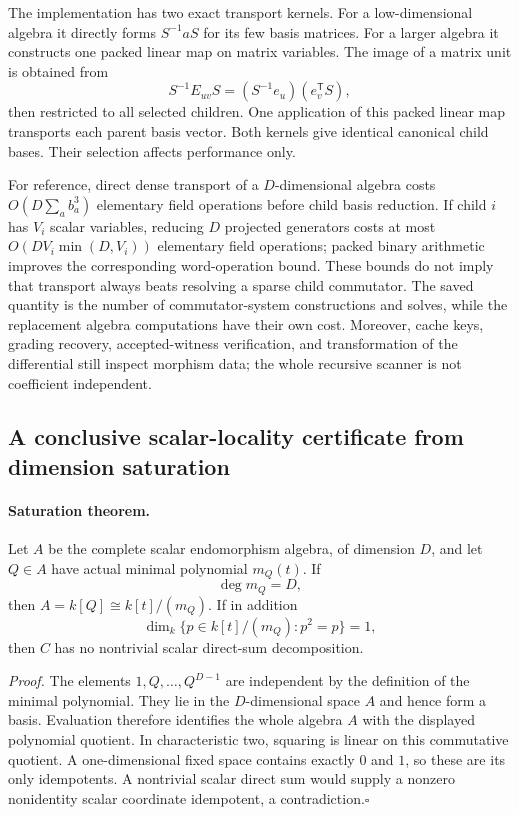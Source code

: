 The implementation has two exact transport kernels. For a low-dimensional
algebra it directly forms $S^{-1}aS$ for its few basis matrices. For a larger
algebra it constructs one packed linear map on matrix variables. The image
of a matrix unit is obtained from
\[
 S^{-1}E_{uv}S=(S^{-1}e_u)(e_v^{\mathsf T}S),
\]
then restricted to all selected children. One application of this packed
linear map transports each parent basis vector. Both kernels give identical
canonical child bases. Their selection affects performance only.

For reference, direct dense transport of a $D$-dimensional algebra costs
$O(D\sum_a b_a^3)$ elementary field operations before child basis
reduction. If child $i$ has $V_i$ scalar variables, reducing $D$ projected
generators costs at most $O(DV_i\min(D,V_i))$ elementary field operations;
packed binary arithmetic improves the corresponding word-operation bound.
These bounds do not imply that transport always beats resolving a sparse
child commutator. The saved quantity is the number of commutator-system
constructions and solves, while the replacement algebra computations have
their own cost. Moreover, cache keys, grading recovery, accepted-witness
verification, and transformation of the differential still inspect
morphism data; the whole recursive scanner is not coefficient independent.

\subsection{A conclusive scalar-locality certificate from dimension saturation}

\paragraph{Saturation theorem.}
Let $A$ be the complete scalar endomorphism algebra, of dimension $D$, and
let $Q\in A$ have actual minimal polynomial $m_Q(t)$. If
\[
 \deg m_Q=D,
\]
then $A=k[Q]\cong k[t]/(m_Q)$. If in addition
\[
 \dim_k\{p\in k[t]/(m_Q):p^2=p\}=1,
\]
then $C$ has no nontrivial scalar direct-sum decomposition.

\emph{Proof.}
The elements $1,Q,\ldots,Q^{D-1}$ are independent by the definition of the
minimal polynomial. They lie in the $D$-dimensional space $A$ and hence form
a basis. Evaluation therefore identifies the whole algebra $A$ with the
displayed polynomial quotient. In characteristic two, squaring is linear
on this commutative quotient. A one-dimensional fixed space contains exactly
$0$ and $1$, so these are its only idempotents. A nontrivial scalar direct
sum would supply a nonzero nonidentity scalar coordinate idempotent, a
contradiction.\hfill$\square$

